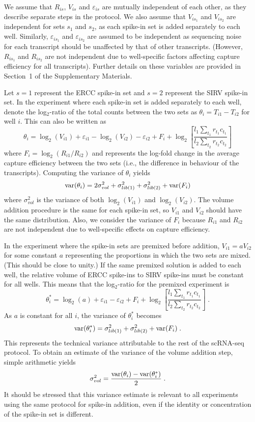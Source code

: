 \documentclass{article}
\newcommand{\suppsecmath}{1}
\begin{document}
We assume that $R_{is}$, $V_{is}$ and $\varepsilon_{is}$ are mutually independent of each other, as they describe separate steps in the protocol.
We also assume that $V_{is_1}$ and $V_{is_2}$ are independent for sets $s_1$ and $s_2$, as each spike-in set is added separately to each well.
Similarly, $\varepsilon_{is_1}$ and $\varepsilon_{is_2}$ are assumed to be independent as sequencing noise for each transcript should be unaffected by that of other transcripts.
(However, $R_{is_1}$ and $R_{is_2}$ are not independent due to well-specific factors affecting capture efficiency for all transcripts).
Further details on these variables are provided in Section~\suppsecmath{} of the Supplementary Materials.

Let $s=1$ represent the ERCC spike-in set and $s=2$ represent the SIRV spike-in set.
In the experiment where each spike-in set is added separately to each well, denote the log$_2$-ratio of the total counts between the two sets as $\theta_i = T_{i1} - T_{i2}$ for well $i$.
This can also be written as
\[
    \theta_i = \log_2(V_{i1}) + \varepsilon_{i1} - \log_2(V_{i2}) - \varepsilon_{i2} + F_i + \log_2\left[ \frac{l_1 \sum_{t_1} r_{t_1} c_{t_1}}{l_2\sum_{t_2} r_{t_2} c_{t_2}} \right]
\]
where $F_i = \log_2(R_{i1}/R_{i2})$ and represents the log-fold change in the average capture efficiency between the two sets (i.e., the difference in behaviour of the transcripts).
Computing the variance of $\theta_i$ yields
\[
\mbox{var}(\theta_i) = 2 \sigma^2_{vol} + \sigma^2_{lib(1)} + \sigma^2_{lib(2)} + \mbox{var}(F_i)
\]
where $\sigma^2_{vol}$ is the variance of both $\log_2(V_{i1})$ and $\log_2(V_{i2})$.
The volume addition procedure is the same for each spike-in set, so $V_{i1}$ and $V_{i2}$ should have the same distribution.
Also, we consider the variance of $F_i$ because $R_{i1}$ and $R_{i2}$ are not independent due to well-specific effects on capture efficiency.

In the experiment where the spike-in sets are premixed before addition, $V_{i1}=aV_{i2}$ for some constant $a$ representing the proportions in which the two sets are mixed.
(This should be close to unity.)
If the same premixed solution is added to each well, the relative volume of ERCC spike-ins to SIRV spike-ins must be constant for all wells.
This means that the log$_2$-ratio for the premixed experiment is 
\[
    \theta^*_i = \log_2(a) + \varepsilon_{i1} - \varepsilon_{i2} + F_i + \log_2\left[ \frac{l_1 \sum_{t_1} r_{t_1} c_{t_1}}{l_2\sum_{t_2} r_{t_2} c_{t_2}} \right] \;.
\]
As $a$ is constant for all $i$, the variance of $\theta^*_i$ becomes
\[
\mbox{var}(\theta^*_i) = \sigma^2_{lib(1)} + \sigma^2_{lib(2)} + \mbox{var}(F_i) \;.
\]
This represents the technical variance attributable to the rest of the scRNA-seq protocol.
To obtain an estimate of the variance of the volume addition step, simple arithmetic yields
\[
\sigma^2_{vol} = \frac{\mbox{var}(\theta_i) - \mbox{var}(\theta^*_i)}{2} \;.
\]
It should be stressed that this variance estimate is relevant to all experiments using the same protocol for spike-in addition, even if the identity or concentration of the spike-in set is different.
\end{document}
